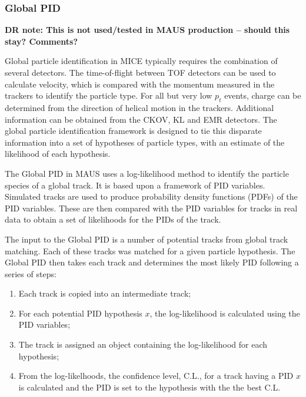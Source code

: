 \documentclass{JINST}
\begin{document}


\subsubsection{Global PID} 

{\bf DR note: This is not used/tested in MAUS production -- should this stay? Comments?}

Global particle identification in MICE typically requires the combination of several detectors. The time-of-flight between TOF detectors can be used to calculate velocity, which is compared 
with the momentum measured in the trackers to identify the particle type. For all but very low $p_t$ events, charge can be determined from the direction of helical motion in the trackers. Additional information can be obtained from the CKOV, KL and EMR detectors. The global particle identification framework is designed to tie this disparate information into a set of hypotheses of particle types, with an estimate of the likelihood of each hypothesis. 


The Global PID in MAUS uses a log-likelihood method to identify the particle species of a global track. It is based upon a framework of PID variables. Simulated tracks are used to produce probability density functions (PDFs) of the PID variables. These are then compared with the PID variables for tracks in real data to obtain a set of likelihoods for the PIDs of the track.

The input to the Global PID is a number of potential tracks from global track matching. Each of these tracks was matched for a given particle hypothesis. The Global PID then takes each track and determines the most likely PID following a series of steps:

\begin{enumerate}
\item Each track is copied into an intermediate track;
\item For each potential PID hypothesis $x$, the log-likelihood is calculated using the PID variables;
\item The track is assigned an object containing the log-likelihood for each hypothesis;
\item From the log-likelhoods, the confidence level, C.L., for a track having a PID $x$ is calculated and the PID is set to the hypothesis with the the best C.L.
\end{enumerate}
\end{document}
